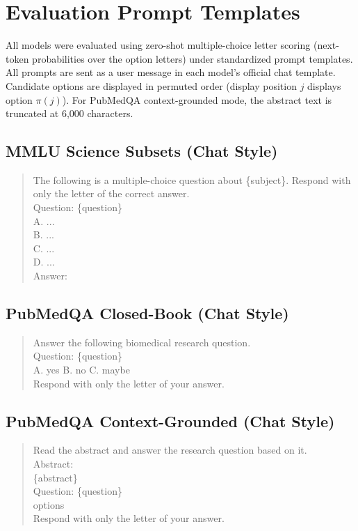 \documentclass[sigconf,nonacm]{acmart}
\makeatletter
\DeclareRobustCommand{\_}{\ifmmode\nfss@text{\textunderscore}\else\textunderscore\allowbreak\fi}
\makeatother
\begin{document}



\appendix
\section{Evaluation Prompt Templates}
All models were evaluated using zero-shot multiple-choice letter scoring (next-token probabilities over the option letters) under standardized prompt templates. All prompts are sent as a user message in each model's official chat template. Candidate options are displayed in permuted order (display position $j$ displays option $\pi(j)$). For PubMedQA context-grounded mode, the abstract text is truncated at 6,000 characters.

\subsection{MMLU Science Subsets (Chat Style)}
\begin{quote}
\small\ttfamily\raggedright
The following is a multiple-choice question about \{subject\}. Respond with only the letter of the correct answer.\\[0.6\baselineskip]
Question: \{question\}\\
A. ...\\
B. ...\\
C. ...\\
D. ...\\
Answer:
\end{quote}

\subsection{PubMedQA Closed-Book (Chat Style)}
\begin{quote}
\small\ttfamily\raggedright
Answer the following biomedical research question.\\[0.6\baselineskip]
Question: \{question\}\\
A. yes B. no C. maybe\\
Respond with only the letter of your answer.
\end{quote}

\subsection{PubMedQA Context-Grounded (Chat Style)}
\begin{quote}
\small\ttfamily\raggedright
Read the abstract and answer the research question based on it.\\[0.6\baselineskip]
Abstract:\\
\{abstract\}\\[0.6\baselineskip]
Question: \{question\}\\
options\\
Respond with only the letter of your answer.
\end{quote}
\end{document}

